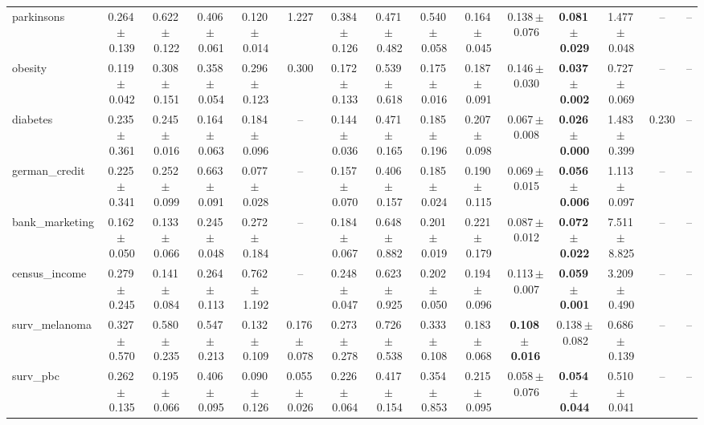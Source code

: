 \documentclass[8pt]{extarticle}
\begin{document}
\begin{longtable}{l*{14}{c}}
parkinsons & 0.264\,$\pm$\,0.139 & 0.622\,$\pm$\,0.122 & 0.406\,$\pm$\,0.061 & 0.120\,$\pm$\,0.014 & 1.227 & 0.384\,$\pm$\,0.126 & 0.471\,$\pm$\,0.482 & 0.540\,$\pm$\,0.058 & 0.164\,$\pm$\,0.045 & 0.138\,$\pm$\,0.076 & \textbf{0.081\,$\pm$\,0.029} & 1.477\,$\pm$\,0.048 & -- & -- \\
obesity & 0.119\,$\pm$\,0.042 & 0.308\,$\pm$\,0.151 & 0.358\,$\pm$\,0.054 & 0.296\,$\pm$\,0.123 & 0.300 & 0.172\,$\pm$\,0.133 & 0.539\,$\pm$\,0.618 & 0.175\,$\pm$\,0.016 & 0.187\,$\pm$\,0.091 & 0.146\,$\pm$\,0.030 & \textbf{0.037\,$\pm$\,0.002} & 0.727\,$\pm$\,0.069 & -- & -- \\
diabetes & 0.235\,$\pm$\,0.361 & 0.245\,$\pm$\,0.016 & 0.164\,$\pm$\,0.063 & 0.184\,$\pm$\,0.096 & -- & 0.144\,$\pm$\,0.036 & 0.471\,$\pm$\,0.165 & 0.185\,$\pm$\,0.196 & 0.207\,$\pm$\,0.098 & 0.067\,$\pm$\,0.008 & \textbf{0.026\,$\pm$\,0.000} & 1.483\,$\pm$\,0.399 & 0.230 & -- \\
german\_credit & 0.225\,$\pm$\,0.341 & 0.252\,$\pm$\,0.099 & 0.663\,$\pm$\,0.091 & 0.077\,$\pm$\,0.028 & -- & 0.157\,$\pm$\,0.070 & 0.406\,$\pm$\,0.157 & 0.185\,$\pm$\,0.024 & 0.190\,$\pm$\,0.115 & 0.069\,$\pm$\,0.015 & \textbf{0.056\,$\pm$\,0.006} & 1.113\,$\pm$\,0.097 & -- & -- \\
bank\_marketing & 0.162\,$\pm$\,0.050 & 0.133\,$\pm$\,0.066 & 0.245\,$\pm$\,0.048 & 0.272\,$\pm$\,0.184 & -- & 0.184\,$\pm$\,0.067 & 0.648\,$\pm$\,0.882 & 0.201\,$\pm$\,0.019 & 0.221\,$\pm$\,0.179 & 0.087\,$\pm$\,0.012 & \textbf{0.072\,$\pm$\,0.022} & 7.511\,$\pm$\,8.825 & -- & -- \\
census\_income & 0.279\,$\pm$\,0.245 & 0.141\,$\pm$\,0.084 & 0.264\,$\pm$\,0.113 & 0.762\,$\pm$\,1.192 & -- & 0.248\,$\pm$\,0.047 & 0.623\,$\pm$\,0.925 & 0.202\,$\pm$\,0.050 & 0.194\,$\pm$\,0.096 & 0.113\,$\pm$\,0.007 & \textbf{0.059\,$\pm$\,0.001} & 3.209\,$\pm$\,0.490 & -- & -- \\
surv\_melanoma & 0.327\,$\pm$\,0.570 & 0.580\,$\pm$\,0.235 & 0.547\,$\pm$\,0.213 & 0.132\,$\pm$\,0.109 & 0.176\,$\pm$\,0.078 & 0.273\,$\pm$\,0.278 & 0.726\,$\pm$\,0.538 & 0.333\,$\pm$\,0.108 & 0.183\,$\pm$\,0.068 & \textbf{0.108\,$\pm$\,0.016} & 0.138\,$\pm$\,0.082 & 0.686\,$\pm$\,0.139 & -- & -- \\
surv\_pbc & 0.262\,$\pm$\,0.135 & 0.195\,$\pm$\,0.066 & 0.406\,$\pm$\,0.095 & 0.090\,$\pm$\,0.126 & 0.055\,$\pm$\,0.026 & 0.226\,$\pm$\,0.064 & 0.417\,$\pm$\,0.154 & 0.354\,$\pm$\,0.853 & 0.215\,$\pm$\,0.095 & 0.058\,$\pm$\,0.076 & \textbf{0.054\,$\pm$\,0.044} & 0.510\,$\pm$\,0.041 & -- & -- \\

\end{longtable}
\end{document}
